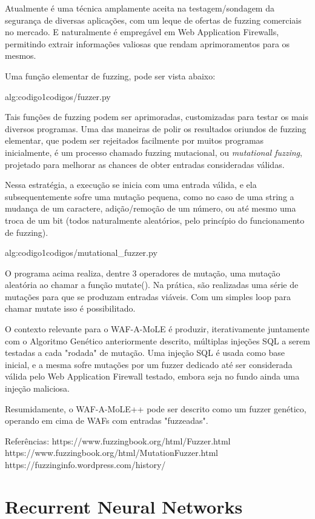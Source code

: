Atualmente é uma técnica amplamente aceita na testagem/sondagem da segurança de diversas aplicações, com um leque de ofertas de fuzzing comerciais no mercado. E naturalmente é empregável em Web Application Firewalls, permitindo extrair informações valiosas que rendam aprimoramentos para os mesmos.

Uma função elementar de fuzzing, pode ser vista abaixo:

 {alg:codigo1}{codigos/fuzzer.py}

\bigskip
Tais funções de fuzzing podem ser aprimoradas, customizadas para testar os mais diversos programas. Uma das maneiras de polir os resultados oriundos de fuzzing elementar, que podem ser rejeitados facilmente por muitos programas inicialmente, é um processo chamado fuzzing mutacional, ou \textit{mutational fuzzing}, projetado para melhorar as chances de obter entradas consideradas válidas.

Nessa estratégia, a execução se inicia com uma entrada válida, e ela subsequentemente sofre uma mutação pequena, como no caso de uma string a mudança de um caractere, adição/remoção de um número, ou até mesmo uma troca de um bit (todos naturalmente aleatórios, pelo princípio do funcionamento de fuzzing).

 {alg:codigo1}{codigos/mutational_fuzzer.py}

\bigskip
O programa acima realiza, dentre 3 operadores de mutação, uma mutação aleatória ao chamar a função mutate(). Na prática, são realizadas uma série de mutações para que se produzam entradas viáveis. Com um simples loop para chamar mutate isso é possibilitado.

O contexto relevante para o WAF-A-MoLE é produzir, iterativamente juntamente com o Algoritmo Genético anteriormente descrito, múltiplas injeções SQL a serem testadas a cada "rodada" de mutação. Uma injeção SQL é usada como base inicial, e a mesma sofre mutações por um fuzzer dedicado até ser considerada válida pelo Web Application Firewall testado, embora seja no fundo ainda uma injeção maliciosa.


Resumidamente, o WAF-A-MoLE++ pode ser descrito como um fuzzer genético, operando em cima de WAFs com entradas "fuzzeadas".

Referências:
https://www.fuzzingbook.org/html/Fuzzer.html
https://www.fuzzingbook.org/html/MutationFuzzer.html
https://fuzzinginfo.wordpress.com/history/

\section{Recurrent Neural Networks}

